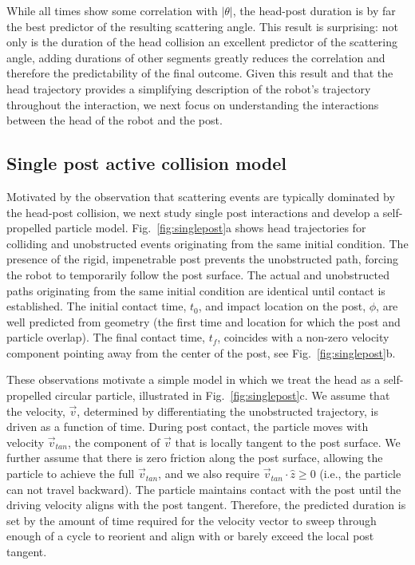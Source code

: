 \documentclass[aps,pre,twocolumn,superscriptaddress]{revtex4-1}
\begin{document}
While all times show some correlation with $|\theta|$, the head-post duration is by far the best predictor of the resulting scattering angle. This result is surprising: not only is the duration of the head collision an excellent predictor of the scattering angle, adding durations of other segments greatly reduces the correlation and therefore the predictability of the final outcome. Given this result and that the head trajectory provides a simplifying description of the robot's trajectory throughout the interaction, we next focus on understanding the interactions between the head of the robot and the post.

\subsection{Single post active collision model}\label{sec:model}

Motivated by the observation that scattering events are typically dominated by the head-post collision, we next study single post interactions and develop a self-propelled particle model. Fig.~\ref{fig:singlepost}a shows head trajectories for colliding and unobstructed events originating from the same initial condition. The presence of the rigid, impenetrable post prevents the unobstructed path, forcing the robot to temporarily follow the post surface. The actual and unobstructed paths originating from the same initial condition are identical until contact is established. The initial contact time, $t_0$, and impact location on the post, $\phi$, are well predicted from geometry (the first time and location for which the post and particle overlap). The final contact time, $t_f$, coincides with a non-zero velocity component pointing away from the center of the post, see Fig.~\ref{fig:singlepost}b.

These observations motivate a simple model in which we treat the head as a self-propelled circular particle, illustrated in Fig.~\ref{fig:singlepost}c. We assume that the velocity, $\vec{v}$, determined by differentiating the unobstructed trajectory, is driven as a function of time. During post contact, the particle moves with velocity $\vec{v}_{tan}$, the component of $\vec{v}$ that is locally tangent to the post surface. We further assume that there is zero friction along the post surface, allowing the particle to achieve the full $\vec{v}_{tan}$, and we also require $\vec{v}_{tan} \cdot \hat{z} \geq 0$ (i.e., the particle can not travel backward). The particle maintains contact with the post until the driving velocity aligns with the post tangent. Therefore, the predicted duration is set by the amount of time required for the velocity vector to sweep through enough of a cycle to reorient and align with or barely exceed the local post tangent.  
\end{document}
